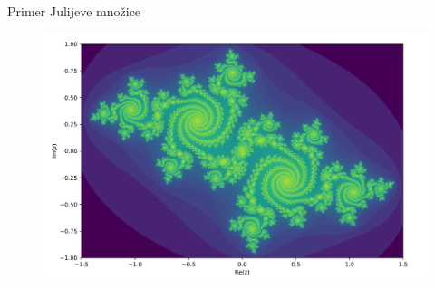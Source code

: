 \documentclass{beamer}
\theoremstyle{definition}
\begin{document}
\begin{frame}{Primer Julijeve množice}
\begin{figure}
    \includegraphics[scale=0.25]{julia_set.png }
\end{figure}
\end{frame}
\end{document}
